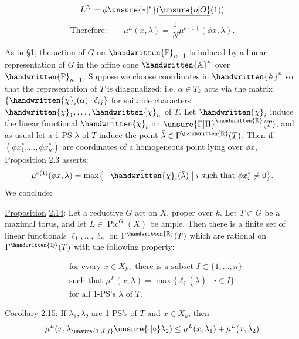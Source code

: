 
\[
 L^{N}=\phi\unsure{\ast|{}^{*}}(\underline{\unsure{o|O}}(1))
\]
\[
 \text{Therefore:}\qquad \mu^{L}(x,\lambda)=\frac{1}{N}\mu^{o(1)}(\phi x,\lambda).
\]

As in \S1, the action of $G$ on $\handwritten{\mathbb{P}}_{n-1}$ is induced by a linear representation of $G$ in the affine cone $\handwritten{\mathbb{A}}^{n}$ over $\handwritten{\mathbb{P}}_{n-1}$. Suppose we choose coordinates in $\handwritten{\mathbb{A}}^{n}$ so that the representation of $T$ is diagonalized: i.e. $\alpha\in T_k$ acts via the matrix $\{\handwritten{\chi}_i(\alpha)\cdot\delta_{ij}\}$ for suitable characters $\handwritten{\chi}_1,\ldots,\handwritten{\chi}_n$ of $T$. Let $\handwritten{\chi}_i$ induce the linear functional $\bar{\handwritten{\chi}}_i$ on $\unsure{\Gamma|\Pi}^{\handwritten{\mathbb{R}}}(T)$, and as usual let a 1-PS $\lambda$ of $T$ induce the point $\bar{\lambda}\in\Gamma^{\handwritten{\mathbb{R}}}(T)$. Then if $(\phi x_1^*,\ldots,\phi x_n^*)$ are coordinates of a homogeneous point lying over $\phi x$, Proposition 2.3 asserts:
\[
 \mu^{o(1)}(\phi x,\lambda)=\max\bigl\{-\bar{\handwritten{\chi}}_i(\bar{\lambda})\bigm|i\text{ such that }\phi x_i^*\neq 0\bigr\}.
\]
We conclude:

\uline{Proposition} \uline{2.14}: Let a reductive $G$ act on $X$, proper over $k$. Let $T\subset G$ be a maximal torus, and let $L\in\operatorname{Pic}^{G}(X)$ be ample. Then there is a finite set of linear functionals $\ell_1,\ldots,\ell_n$ on $\Gamma^{\handwritten{\mathbb{R}}}(T)$ which are rational on $\Gamma^{\handwritten{\mathbb{Q}}}(T)$ with the following property:

\[
\begin{aligned}
&\text{for every }x\in X_k,\text{ there is a subset }I\subset\{1,\ldots,n\}\\
&\text{such that }\mu^{L}(x,\lambda)=\max\{\ell_i(\bar{\lambda})\mid i\in I\}\\
&\text{for all 1-PS's }\lambda\text{ of }T.
\end{aligned}
\]

\uline{Corollary} \uline{2.15}: If $\lambda_1,\lambda_2$ are 1-PS's of $T$ and $x\in X_k$, then
\[
 \mu^{L}(x,\lambda_{\unsure{1|J|j}}\unsure{\cdot|\circ}\lambda_2)\leq\mu^{L}(x,\lambda_1)+\mu^{L}(x,\lambda_2)
\]
